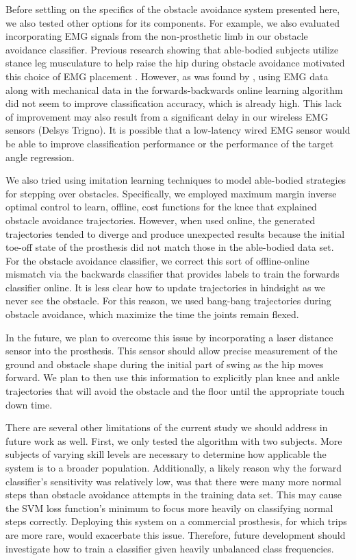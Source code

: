 Before settling on the specifics of the obstacle avoidance system presented
here, we also tested other options for its components. For example, we also
evaluated incorporating EMG signals from the non-prosthetic limb in our obstacle
avoidance classifier. Previous research showing that able-bodied subjects
utilize stance leg musculature to help raise the hip during obstacle avoidance
motivated this choice of EMG placement \citep{patla1995role}. However, as was
found by \citet{spanias2018online}, using EMG data along with mechanical data in
the forwards-backwards online learning algorithm did not seem to improve
classification accuracy, which is already high. This lack of improvement may
also result from a significant delay in our wireless EMG sensors (Delsys
Trigno). It is possible that a low-latency wired EMG sensor would be able to
improve classification performance or the performance of the target angle
regression.

We also tried using imitation learning techniques to model able-bodied
strategies for stepping over obstacles. Specifically, we employed maximum margin
inverse optimal control \citep{ratliff2007online} to learn, offline, cost
functions for the knee that explained obstacle avoidance trajectories. However,
when used online, the generated trajectories tended to diverge and produce
unexpected results because the initial toe-off state of the prosthesis did not
match those in the able-bodied data set. For the obstacle avoidance classifier,
we correct this sort of offline-online mismatch via the backwards classifier
that provides labels to train the forwards classifier online. It is less clear
how to update trajectories in hindsight as we never see the obstacle. For this
reason, we used bang-bang trajectories during obstacle avoidance, which maximize
the time the joints remain flexed.

In the future, we plan to overcome this issue by incorporating a laser distance
sensor into the prosthesis. This sensor should allow precise measurement of the
ground and obstacle shape during the initial part of swing as the hip moves
forward. We plan to then use this information to explicitly plan knee and ankle
trajectories that will avoid the obstacle and the floor until the appropriate
touch down time.

There are several other limitations of the current study we should address in
future work as well. First, we only tested the algorithm with two subjects. More
subjects of varying skill levels are necessary to determine how applicable the
system is to a broader population. Additionally, a likely reason why the forward
classifier's sensitivity was relatively low, was that there were many more
normal steps than obstacle avoidance attempts in the training data set. This may
cause the SVM loss function's minimum to focus more heavily on classifying
normal steps correctly. Deploying this system on a commercial prosthesis, for
which trips are more rare, would exacerbate this issue. Therefore, future
development should investigate how to train a classifier given heavily
unbalanced class frequencies.
